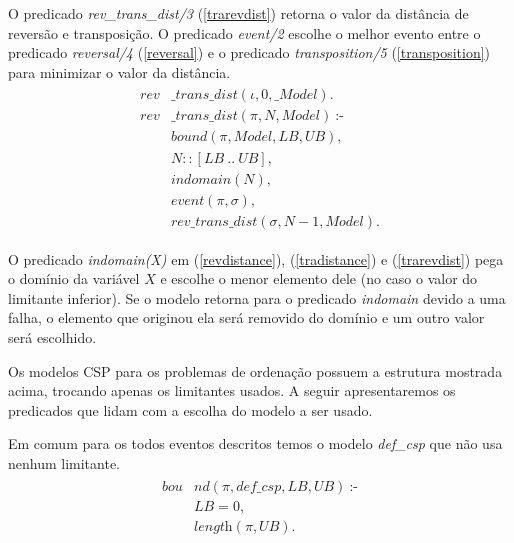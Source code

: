 O predicado \textit{rev\_trans\_dist/3} (\ref{trarevdist}) retorna o
valor da distância de reversão e transposição. O
predicado \textit{event/2} escolhe o melhor evento entre o
predicado \textit{reversal/4} (\ref{reversal}) e o
predicado \textit{transposition/5} (\ref{transposition}) para
minimizar o valor da distância.
\begin{align}
  \label{trarevdist}
  \begin{split}
  \textit{rev}&\textit{\_trans\_dist}(\iota, 0, \_Model). \\
  \textit{rev}&\textit{\_trans\_dist}(\pi, N, Model)~\text{:-} \\
  &\textit{bound}(\pi, Model, LB, UB), \\
  &N :: [LB~..~UB], \\
  &\textit{indomain}(N),  \\
  &\textit{event}(\pi, \sigma),  \\
  &\textit{rev\_trans\_dist}(\sigma, N-1, Model). 
  \end{split}
\end{align}

O predicado \textit{indomain(X)} em (\ref{revdistance}),
(\ref{tradistance}) e (\ref{trarevdist}) pega o domínio da variável
$X$ e escolhe o menor elemento dele (no caso o valor do limitante
inferior). Se o modelo retorna para o predicado \textit{indomain}
devido a uma falha, o elemento que originou ela será removido do
domínio e um outro valor será escolhido.

Os modelos CSP para os problemas de ordenação possuem a estrutura
mostrada acima, trocando apenas os limitantes usados. A seguir
apresentaremos os predicados que lidam com a escolha do modelo a ser
usado.

Em comum para os todos eventos descritos temos o
modelo \textit{def\_csp} que não usa nenhum limitante.
\begin{align}
  \label{bound_def}
  \begin{split}
  \textit{bou}&\textit{nd}(\pi, def\_csp, LB, UB)~\text{:-} \\
  &LB = 0, \\
  &\textit{length}(\pi, UB).
  \end{split}
\end{align}

